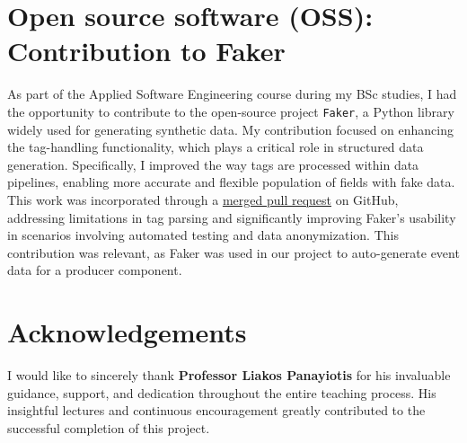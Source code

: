 \documentclass[a4paper,11pt]{article}
\theoremstyle{mytheor}
\begin{document}
\section*{Open source software (OSS): Contribution to Faker}
As part of the Applied Software Engineering course during my BSc studies, I had the opportunity to contribute to the open-source project \texttt{Faker}, a Python library widely used for generating synthetic data. My contribution focused on enhancing the tag-handling functionality, which plays a critical role in structured data generation. Specifically, I improved the way tags are processed within data pipelines, enabling more accurate and flexible population of fields with fake data. This work was incorporated through a \href{https://github.com/joke2k/faker/pull/1648}{merged pull request} on GitHub, addressing limitations in tag parsing and significantly improving Faker’s usability in scenarios involving automated testing and data anonymization. This contribution was relevant, as Faker was used in our project to auto-generate event data for a producer component.


\section*{Acknowledgements}
I would like to sincerely thank \textbf{Professor Liakos Panayiotis} for his invaluable guidance, support, and dedication throughout the entire teaching process. His insightful lectures and continuous encouragement greatly contributed to the successful completion of this project.
\end{document}
